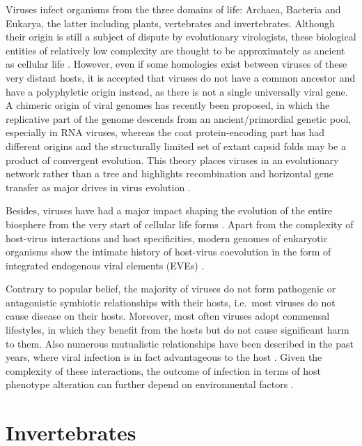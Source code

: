 \documentclass[
  openany]{book}
\begin{document}
Viruses infect organisms from the three domains of life: Archaea, Bacteria and Eukarya, the latter including plants, vertebrates and invertebrates. Although their origin is still a subject of dispute by evolutionary virologists, these biological entities of relatively low complexity are thought to be approximately as ancient as cellular life \autocite{Holmes2011,Koonin2006}. However, even if some homologies exist between viruses of these very distant hosts, it is accepted that viruses do not have a common ancestor and have a polyphyletic origin instead, as there is not a single universally viral gene. A chimeric origin of viral genomes has recently been proposed, in which the replicative part of the genome descends from an ancient/primordial genetic pool, especially in RNA viruses, whereas the coat protein-encoding part has had different origins and the structurally limited set of extant capsid folds may be a product of convergent evolution. This theory places viruses in an evolutionary network rather than a tree and highlights recombination and horizontal gene transfer as major drives in virus evolution \autocite{Krupovic2019}.

Besides, viruses have had a major impact shaping the evolution of the entire biosphere from the very start of cellular life forms \autocite{Forterre2006}. Apart from the complexity of host-virus interactions and host specificities, modern genomes of eukaryotic organisms show the intimate history of host-virus coevolution in the form of integrated endogenous viral elements (EVEs) \autocite{Feschotte2012}.

Contrary to popular belief, the majority of viruses do not form pathogenic or antagonistic symbiotic relationships with their hosts, i.e.~most viruses do not cause disease on their hosts. Moreover, most often viruses adopt commensal lifestyles, in which they benefit from the hosts but do not cause significant harm to them. Also numerous mutualistic relationships have been described in the past years, where viral infection is in fact advantageous to the host \autocite{Roossinck2017,Gonzalez2021}. Given the complexity of these interactions, the outcome of infection in terms of host phenotype alteration can further depend on environmental factors \autocite{Rodriguez2008,Gonzalez2021}.

\hypertarget{invertebrates}{%
\section{Invertebrates}\label{invertebrates}}
\end{document}
